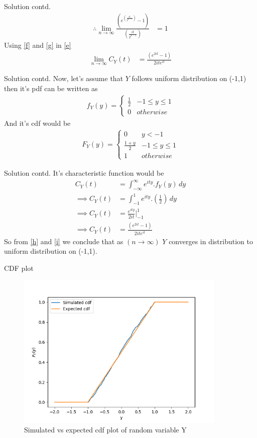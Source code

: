 \documentclass{beamer}
\providecommand{\brak}[1]{\ensuremath{\left(#1\right)}}
\begin{document}
\begin{frame}{Solution contd.}
\begin{align}
\therefore\lim_{n\to\infty}\frac{\brak{e^{\brak{\frac{it}{2^{n-1}}}}-1}}{\brak{\frac{it}{2^{n-1}}}}&=1
    \label{f}
\end{align}
Using \eqref{f} and \eqref{g} in \eqref{e}
\begin{align}
    \lim_{n\to\infty} C_{Y}\brak{t}&=\frac{\brak{e^{2it}-1}}{2ite^{it}}
    \label{h}
\end{align}
\end{frame}
\begin{frame}{Solution contd.}
    Now, let's assume that $Y$ follows uniform distribution on (-1,1) then it's pdf can be written as
\begin{align}
    f_{Y}(y)=\begin{cases} 
            \frac{1}{2}  &  -1\le y\le 1\\
            0 &  otherwise
            \end{cases}
\end{align}
And it's cdf would be
\begin{align}
    F_{Y}(y)=\begin{cases} 
            0 & y<-1\\
            \frac{1+y}{2}  &  -1\le y\le 1\\
            1 &  otherwise
            \end{cases}
\end{align}
\end{frame}
\begin{frame}{Solution contd.}
    It's characteristic function would be 
\begin{align}
   C_{Y}\brak{t}&= \int_{-\infty}^{\infty} e^{ity}.f_{Y}(y) \,dy\\
    \implies C_{Y}\brak{t}&=\int_{-1}^{1} e^{ity}.\brak{\frac{1}{2}} \,dy\\
    \implies C_{Y}\brak{t}&=\frac{e^{ity}}{2it}\Biggr|^1_{-1}\\
    \implies C_{Y}\brak{t}&=\frac{\brak{e^{2it}-1}}{2ite^{it}}
    \label{i}
\end{align}
So from \eqref{h} and \eqref{i} we conclude that as $\brak{n\rightarrow\infty}$ $Y$ converges in distribution to uniform distribution on (-1,1).
\end{frame}
\begin{frame}{CDF plot}
    \begin{figure}[ht]
    \centering
    \includegraphics[width=100mm]{simulated_cdf.png}
    \caption{Simulated vs expected cdf plot of random variable Y}
    \label{cdf_plot}
\end{figure}
\end{frame}
\end{document}

